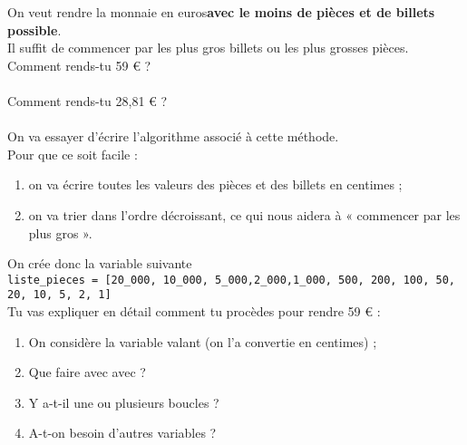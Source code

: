 \documentclass[a4paper,10pt,french]{article}
\begin{document}

On veut rendre la monnaie en euros\textbf{avec le moins de pièces et de billets possible}.\\
Il suffit de commencer par les plus gros billets ou les plus grosses pièces.\\

Comment rends-tu 59 € ?\\

\\

Comment rends-tu 28,81 € ?\\

\\

On va essayer d'écrire l'algorithme associé à cette méthode.\\

Pour que ce soit facile :
\begin{enumerate}[--]
	\item 	on va écrire toutes les valeurs des pièces et des billets en centimes ;
	\item 	on va trier dans l'ordre décroissant, ce qui nous aidera à « commencer par les plus gros ».
\end{enumerate}
On crée donc la variable suivante\\ 

\texttt{liste_pieces = [20_000, 10_000, 5_000,2_000,1_000, 500, 200, 100, 50, 20, 10, 5, 2, 1]} \\

Tu vas expliquer en détail comment tu procèdes pour rendre 59 € : 
\begin{enumerate}[--]
	\item 	On considère la variable  valant  (on l'a convertie en centimes) ;
	\item 	Que faire avec avec  ?
    \item 	Y a-t-il une ou plusieurs boucles ?
    \item  	A-t-on besoin d'autres variables ?\\
\end{enumerate}
 
\\

\\
\end{document}

